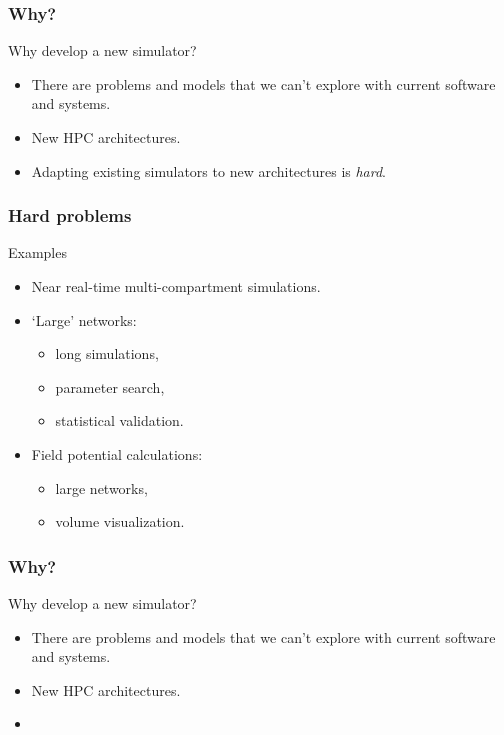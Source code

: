 \documentclass[aspectratio=43,12pt]{beamer}
\newcommand{\subheading}[1]{{\large #1}}
\begin{document}
\begin{frame}
\frametitle{Why?}
\subheading{Why develop a new simulator?}
\baselineskip
\begin{itemize}
\item
There are problems and models that we can't explore
with current software and systems.
\item
New HPC architectures.
\item
Adapting existing simulators to new architectures is \emph{hard}.
\end{itemize}
\vfill
\end{frame}

\begin{frame}
\frametitle{Hard problems}
\subheading{Examples}
\vfill
\begin{itemize}
\item
Near real-time multi-compartment simulations.
\item `Large' networks:\
\begin{itemize}
\item long simulations,
\item parameter search,
\item statistical validation.
\end{itemize}
\item Field potential calculations:\\
\begin{itemize}
\item large networks,
\item volume visualization.
\end{itemize}
\end{itemize}
\vfill
\end{frame}

\begin{frame}
\frametitle{Why?}
\subheading{Why develop a new simulator?}
\begin{itemize}
\item
\textcolor{light-grey}{%
There are problems and models that we can't explore
with current software and systems.}
\item
New HPC architectures.
\item[]
{}
\end{itemize}
\vfill
\end{frame}
\end{document}
